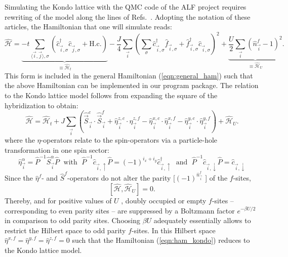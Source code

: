 Simulating the Kondo lattice with the QMC code of the ALF project    requires rewriting of the model along the lines of Refs.~\cite{Assaad99a,Capponi00,Beach04}.  
Adopting the notation of these articles,   the Hamiltonian that one will simulate reads: 
 \begin{equation}\label{eqn:ham_kondo}
 	\hat{\mathcal{H}}  = 
	\underbrace{-t \sum_{\langle  \vec{i},\vec{j} \rangle,\sigma} \left( \hat{c}_{\vec{i},\sigma}^{\dagger}  \hat{c}_{\vec{j},\sigma}^{\phantom\dagger}   + \text{H.c.} \right) }_{\equiv \hat{\mathcal{H}}_t} - \frac{J}{4} 
	\sum_{\vec{i}} \left( \sum_{\sigma} \hat{c}_{\vec{i},\sigma}^{\dagger}  \hat{f}_{\vec{i},\sigma}^{\phantom\dagger}  + 
	                                                        \hat{f}_{\vec{i},\sigma}^{\dagger}  \hat{c}_{\vec{i},\sigma}^{\phantom\dagger}   \right)^{2}   +
        \underbrace{\frac{U}{2}   \sum_{\vec{i}}   \left( \hat{n}^{f}_{\vec{i}} -1 \right)^2}_{\equiv \hat{\mathcal{H}}_U}.
 \end{equation}
This form is included in the general Hamiltonian (\ref{eqn:general_ham})  such that the above Hamiltonian can  be implemented in our program package.  
The  relation to the Kondo lattice model follows  from expanding the square  of the hybridization to obtain: 
 \begin{equation}
 	\hat{\mathcal{H}}  =\hat{\mathcal{H}}_t   
	+ J \sum_{\vec{i}}  \left(  \hat{\vec{S}}^{c}_{\vec{i}} \cdot  \hat{\vec{S}}^{f}_{\vec{i}}    +   \hat{\eta}^{z,c}_{\vec{i}} \cdot  \hat{\eta}^{z,f}_{\vec{i}}  
		-  \hat{\eta}^{x,c}_{\vec{i}} \cdot  \hat{\eta}^{x,f}_{\vec{i}}  -  \hat{\eta}^{y,c}_{\vec{i}} \cdot  \hat{\eta}^{y,f}_{\vec{i}} \right) 
	 + \hat{\mathcal{H}}_U.
 \end{equation}
 where the $\eta$-operators  relate to the spin-operators via a particle-hole transformation in one spin sector: 
 \begin{equation} 
 	\hat{\eta}^{\alpha}_{\vec{i}}  = \hat{P}^{-1}  \hat{S}^{\alpha}_{\vec{i}} \hat{P}  	\; \text{ with }  \;   
	\hat{P}^{-1}  \hat{c}^{\phantom\dagger}_{\vec{i},\uparrow} \hat{P}  =   (-1)^{i_x+i_y} \hat{c}^{\dagger}_{\vec{i},\uparrow}  \; \text{ and }  \;   
	\hat{P}^{-1}  \hat{c}^{\phantom\dagger}_{\vec{i},\downarrow} \hat{P}  = \hat{c}^{\phantom\dagger}_{\vec{i},\downarrow} 
 \end{equation}
 Since the $\hat{\eta}^{f} $- and $ \hat{S}^{f} $-operators  do not alter the  parity [$(-1)^{\hat{n}^{f}_{\vec{i}}}$ ] of the $f$-sites, 
 \begin{equation}
 	\left[  \hat{\mathcal{H}}, \hat{\mathcal{H}}_U \right] = 0.
 \end{equation}
 Thereby,  and for positive values of $U$ ,  doubly occupied  or empty $f$-sites -- corresponding to even parity sites -- are suppressed  by a  Boltzmann factor 
 $e^{-\beta U/2} $ in comparison to odd parity sites.   Choosing $\beta U $ adequately essentially allows to  restrict the Hilbert space to  odd parity $f$-sites.  
 In this Hilbert space $\hat{\eta}^{x,f} = \hat{\eta}^{y,f} =  \hat{\eta}^{z,f} =0$  such that the Hamiltonian (\ref{eqn:ham_kondo}) reduces to the Kondo lattice model. 


